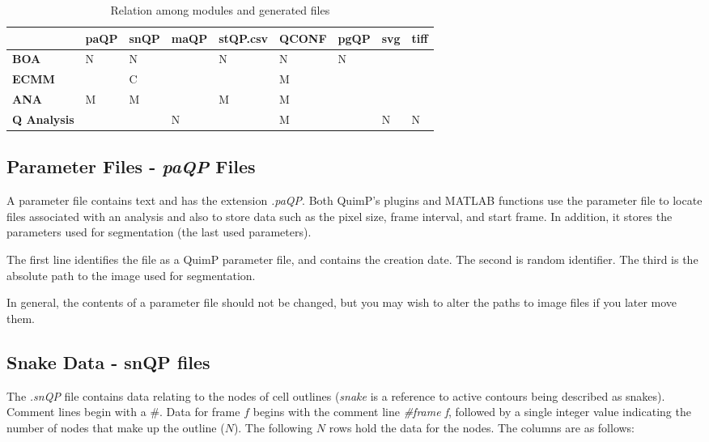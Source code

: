 \documentclass[a4paper,12pt]{article}
\begin{document}
\begin{table}[]
	\centering
	\caption{Relation among modules and generated files}
	\label{filestable}
	\begin{tabular}{|l|l|l|l|l|l|l|l|l|}
		&  \textbf{paQP}&  \textbf{snQP}&  \textbf{maQP}&  \textbf{stQP.csv}&  \textbf{QCONF}&  \textbf{pgQP}& \textbf{svg}&  \textbf{tiff}\\ \hline
		\textbf{BOA} &   N&  N&  &  N&  N&  N&  &  \\
		\textbf{ECMM}&    &  C&  &   &  M&   &  &  \\
		\textbf{ANA} &   M&  M&  &  M&  M&   &  &  \\
		\textbf{Q Analysis}&  &  &  N&  &  M&  &  N& N 
	\end{tabular}
\end{table}

  
\subsection{Parameter Files - \textit{paQP} Files}
\label{paQP}

A parameter file contains text and has the extension \textit{.paQP}.  Both QuimP's plugins and
MATLAB functions use the parameter file to locate files associated with an analysis and also to store data such as the
pixel size, frame interval, and start frame.  In addition, it stores the parameters used for segmentation
(the last used parameters).

The first line identifies the file as a QuimP parameter file, and contains the creation date.
The second is random identifier.
The third is the absolute path to the image used for segmentation.
 
In general, the contents of a parameter file should not be changed, but you may wish to alter the paths to
image files if you later move them.
 

\subsection{Snake Data - snQP files}
\label{snQP}

The \textit{.snQP} file contains data relating to the nodes of cell outlines (\textit{snake} is a reference to active contours being 
described as snakes).   Comment lines
begin with a \#.  Data for frame $f$ begins with the comment line \textit{\#frame f}, followed by a single integer value
indicating the number of nodes that make up the outline ($N$).  The following $N$ rows hold the data for the nodes. The 
columns are as follows:
\end{document}
